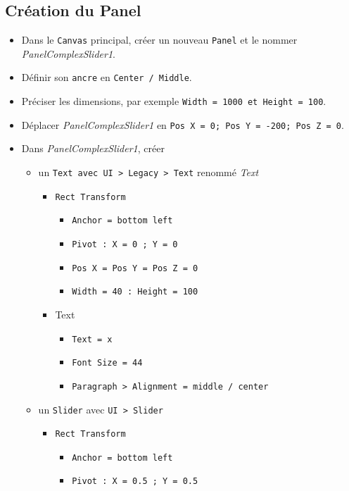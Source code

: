 \documentclass[a4paper,10pt]{article}
\newenvironment{solution}%
{\begin{tcolorbox}[breakable,colback=red!5!white,colframe=red!75!black,title=Solution]}%
{\end{tcolorbox}}
\begin{document}
\ifversionenseignant
\begin{solution}
\subsection{Création du Panel}
\begin{itemize}
	\item Dans le \texttt{Canvas} principal, créer un nouveau \texttt{Panel} et le nommer \textit{PanelComplexSlider1}. 
	\item Définir son \texttt{ancre} en \texttt{Center / Middle}.
	\item  Préciser les dimensions, par exemple \texttt{Width = 1000 et Height = 100}. \item Déplacer \textit{PanelComplexSlider1} en \texttt{Pos X = 0; Pos Y = -200; Pos Z = 0}.	
	\item Dans \textit{PanelComplexSlider1}, créer
	\begin{itemize}
		\item un  \texttt{Text avec UI > Legacy > Text} renommé \textit{Text}
		\begin{itemize}
			\item \texttt{Rect Transform}
			\begin{itemize}
				\item \texttt{Anchor = bottom left}
				\item \texttt{Pivot : X = 0 ; Y = 0}
				\item \texttt{Pos X = Pos Y = Pos Z = 0}
				\item \texttt{Width = 40 : Height = 100}				
			\end{itemize}
		    \item Text
		    \begin{itemize}
		    	\item \texttt{Text = x}
		    	\item \texttt{Font Size = 44}
		    	\item \texttt{Paragraph > Alignment = middle / center}
		    \end{itemize}
		\end{itemize}
		\item un \texttt{Slider} avec \texttt{UI > Slider}
		\begin{itemize}
			\item \texttt{Rect Transform}
			\begin{itemize}
				\item \texttt{Anchor = bottom left}
				\item \texttt{Pivot : X = 0.5 ; Y = 0.5}

\end{itemize}
\end{itemize}
\end{itemize}
\end{itemize}
\end{solution}
\end{document}
